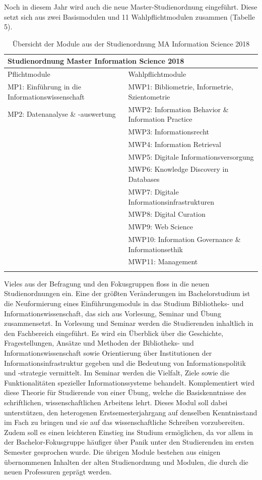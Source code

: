 \documentclass[a4paper,
fontsize=11pt,
oneside,
numbers=noperiodatend,
parskip=half-,
bibliography=totoc,
final
]{scrartcl}
\begin{document}
Noch in diesem Jahr wird auch die neue Master-Studienordnung eingeführt.
Diese setzt sich aus zwei Basismodulen und 11 Wahlpflichtmodulen
zusammen (Tabelle 5).

\pagebreak

\begin{longtable}[]{@{}p{8cm}p{8cm}@{}}
\toprule
\multicolumn{2}{l}{\textbf{Studienordnung Master Information Science 2018}} \tabularnewline
\midrule
\endhead
Pflichtmodule & Wahlpflichtmodule\tabularnewline
\midrule
MP1: Einführung in die Informationswissenschaft & MWP1: Bibliometrie,
Informetrie, Szientometrie\tabularnewline
MP2: Datenanalyse \& -auswertung & MWP2: Information Behavior \&
Information Practice\tabularnewline
& MWP3: Informationsrecht\tabularnewline
& MWP4: Information Retrieval\tabularnewline
& MWP5: Digitale Informationsversorgung\tabularnewline
& MWP6: Knowledge Discovery in Databases\tabularnewline
& MWP7: Digitale Informationsinfrastrukturen\tabularnewline
& MWP8: Digital Curation\tabularnewline
& MWP9: Web Science\tabularnewline
& MWP10: Information Governance \& Informationsethik\tabularnewline
& MWP11: Management\tabularnewline
\bottomrule
\caption{Übersicht der Module aus der Studienordnung MA Information
Science 2018}
\end{longtable}

Vieles aus der Befragung und den Fokusgruppen floss in die neuen
Studienordnungen ein. Eine der größten Veränderungen im Bachelorstudium
ist die Neuformierung eines Einführungsmoduls in das Studium
Bibliotheks- und Informationswissenschaft, das sich aus Vorlesung,
Seminar und Übung zusammensetzt. In Vorlesung und Seminar werden die
Studierenden inhaltlich in den Fachbereich eingeführt. Es wird ein
Überblick über die Geschichte, Fragestellungen, Ansätze und Methoden der
Bibliotheks- und Informationswissenschaft sowie Orientierung über
Institutionen der Informationsinfrastruktur gegeben und die Bedeutung
von Informationspolitik und -strategie vermittelt. Im Seminar werden die
Vielfalt, Ziele sowie die Funktionalitäten spezieller
Informationssysteme behandelt. Komplementiert wird diese Theorie für
Studierende von einer Übung, welche die Basiskenntnisse des
schriftlichen, wissenschaftlichen Arbeitens lehrt. Dieses Modul soll
dabei unterstützen, den heterogenen Erstsemesterjahrgang auf denselben
Kenntnisstand im Fach zu bringen und sie auf das wissenschaftliche
Schreiben vorzubereiten. Zudem soll es einen leichteren Einstieg ins
Studium ermöglichen, da vor allem in der Bachelor-Fokusgruppe häufiger
über Panik unter den Studierenden im ersten Semester gesprochen wurde.
Die übrigen Module bestehen aus einigen übernommenen Inhalten der alten
Studienordnung und Modulen, die durch die neuen Professuren geprägt
werden.
\end{document}
